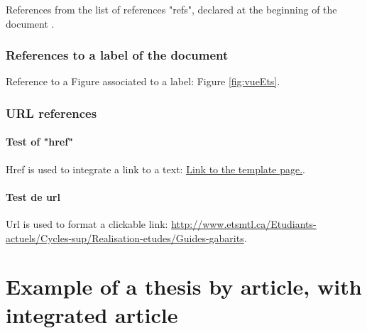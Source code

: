 \documentclass[letterpaper%
, twoside%
, 12pt%
,these%
, english%
,creativecommons,hyperref%
]{thETS}
\begin{document}
References from the list of references "refs", declared at the beginning of the document .

\subsection{References to a label of the document}

Reference to a Figure associated to a label: Figure \ref{fig:vueEts}.

\subsection{URL references}

\subsubsection{Test of "href"}

Href is used to integrate a link to a text:
\href{http://www.etsmtl.ca/Etudiants-actuels/Cycles-sup/Realisation-etudes/Guides-gabarits}{Link to the template page.}.

\subsubsection{Test de url}

Url is used to format a clickable link:
\url{http://www.etsmtl.ca/Etudiants-actuels/Cycles-sup/Realisation-etudes/Guides-gabarits}.

\chapter{Example of a thesis by article, with integrated article}


\end{document}
